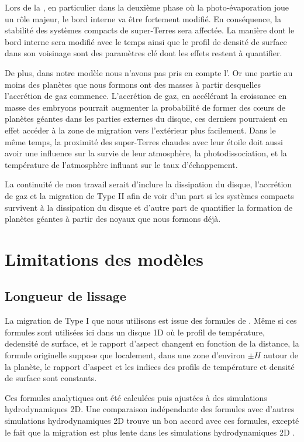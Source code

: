 \bigskip

Lors de la , en particulier dans la deuxième phase où la photo-évaporation joue un rôle majeur, le bord interne va être fortement modifié. En conséquence, la stabilité des systèmes compacts de super-Terres sera affectée. La manière dont le bord interne sera modifié avec le temps ainsi que le profil de densité de surface dans son voisinage sont des paramètres clé dont les effets restent à quantifier. 

De plus, dans notre modèle nous n'avons pas pris en compte l'. Or une partie au moins des planètes que nous
formons ont des masses à partir desquelles l'accrétion de gaz commence. L'accrétion de gaz, en accélérant la croissance en
masse des embryons pourrait augmenter la probabilité de former des cœurs de planètes géantes dans les parties externes du
disque, ces derniers pourraient en effet accéder à la zone de migration vers l'extérieur plus facilement. Dans le même temps, la
proximité des super-Terres chaudes avec leur étoile doit aussi avoir une influence sur la survie de leur atmosphère, la photodissociation, et la température de l'atmosphère influant sur le taux d'échappement. 

La continuité de mon travail serait d'inclure la dissipation du disque, l'accrétion de gaz et la migration de Type II afin de voir d'un part si les systèmes compacts survivent à la dissipation du disque et d'autre part de quantifier la formation de planètes géantes à partir des noyaux que nous formons déjà.

\section{Limitations des modèles}
\subsection{Longueur de lissage}
La migration de Type I que nous utilisons est issue des formules de \cite{paardekooper2011torque}. Même si ces formules sont utilisées ici dans un disque 1D où le profil de température, dedensité de surface, et le rapport d'aspect changent en fonction de la distance, la formule originelle suppose que localement, dans une zone d'environ $\pm H$ autour de la planète, le rapport d'aspect et les indices des profils de température et densité de surface sont constants. 

Ces formules analytiques ont été calculées puis ajustées à des simulations hydrodynamiques 2D. Une comparaison indépendante des formules avec d'autres simulations hydrodynamiques 2D trouve un bon accord avec ces formules, excepté le fait que la migration est plus lente dans les simulations hydrodynamiques 2D \citep{pierens2013makingaccepted}. 

